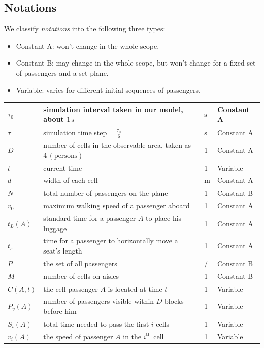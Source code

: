 \documentclass{article}
\newcommand{\cA}{\color{allanblue}Constant A\color{black}}
\newcommand{\cB}{\color{allandarkblue}Constant B\color{black}}
\newcommand{\varr}{\color{allanpurple}Variable\color{black}}
\begin{document}
	\subsection{Notations}
	We classify \textit{notations} into the following three types:
	\begin{itemize}
		\item \cA: won't change in the whole scope.
		\item \cB: may change in the whole scope, but won't change for a fixed set of passengers and a set plane.
		\item \varr: varies for different initial sequences of passengers.
	\end{itemize}
	\begin{center}
	\begin{tabular}{|l|l|l|l|}
		\hline
		$\tau_0$&simulation interval taken in our model, about \(1 \,\mathrm{s}\)&$\mathrm{s}$&\cA\\
		\hline
		\(\tau\)&simulation time step\(=\frac{\tau_0}{6}\)&\(\mathrm{s}\)&\cA\\
		\hline
		\(D\)&number of cells in the observable area, taken as \(4\,\left(\mathrm{persons}\right)\)&1&\cA\\
		\hline
		\(t\)&current time&1&\varr\\
		\hline
		$d$&width of each cell&$\mathrm{m}$&\cA\\
		\hline
		$N$&total number of passengers on the plane&1&\cB\\
		\hline
		$v_0$&maximum walking speed of a passenger aboard&1&\cA\\
		\hline
		$t_L (A)$&standard time for a passenger $A$ to place his luggage&1&\cA\\
		\hline
		$t_s$&time for a passenger to horizontally move a seat's length&1&\cA\\
		\hline
		$P$&the set of all passengers&/&\cB\\
		\hline
		$M$&number of cells on aisles&1&\cB\\
		\hline
		$C\left( A,t \right)$&the cell passenger $A$ is located at time $t$&1&\varr\\
		\hline
		$P_v\left( A \right)$&number of passengers visible within $D$ blocks before him&1&\varr\\
		\hline
		$S_i\left( A \right)$&total time needed to pass the first $i$ cells& 1&\varr\\
		\hline
		$v_i\left( A \right)$&the speed of passenger $A$ in the \(i^{\mathrm{th}}\) cell&1&\varr\\
		\hline

\end{tabular}
\end{center}
\end{document}
